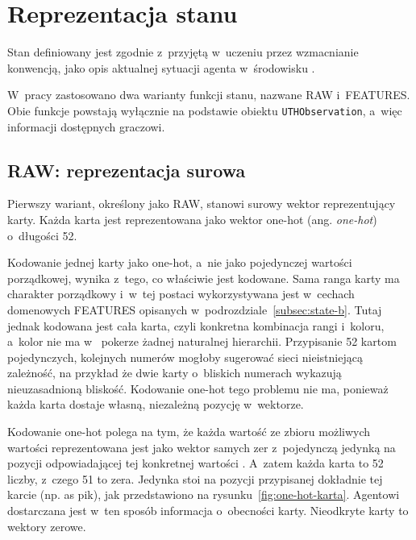 \section{Reprezentacja stanu}
\label{sec:reprezentacja-stanu}
Stan definiowany jest zgodnie z~przyjętą w~uczeniu przez wzmacnianie konwencją, jako
opis aktualnej sytuacji agenta w~środowisku \cite{state_representation}.

W~pracy zastosowano dwa warianty funkcji stanu, nazwane
RAW i~FEATURES. Obie funkcje powstają wyłącznie na podstawie obiektu
\texttt{UTHObservation}, a~więc informacji dostępnych graczowi.

\subsection{RAW: reprezentacja surowa}
\label{subsec:state-a}

Pierwszy wariant, określony jako RAW, stanowi surowy wektor
reprezentujący karty. Każda karta jest reprezentowana jako wektor one-hot (ang. \emph{one-hot}) \cite{one_hot_encoding}
o~długości 52.

Kodowanie jednej karty jako one-hot, a~nie jako pojedynczej wartości
porządkowej, wynika z~tego, co właściwie jest kodowane. Sama ranga karty ma
charakter porządkowy i~w~tej postaci wykorzystywana jest w~cechach domenowych
FEATURES opisanych w~podrozdziale~\ref{subsec:state-b}. Tutaj jednak kodowana jest
cała karta, czyli konkretna kombinacja rangi i~koloru, a~kolor nie ma w~
pokerze żadnej naturalnej hierarchii. Przypisanie 52 kartom pojedynczych,
kolejnych numerów mogłoby sugerować sieci nieistniejącą zależność, na przykład
że dwie karty o~bliskich numerach wykazują nieuzasadnioną bliskość. Kodowanie
one-hot tego problemu nie ma, ponieważ każda karta dostaje własną,
niezależną pozycję w~wektorze.

Kodowanie one-hot polega na tym, że każda wartość ze zbioru możliwych
wartości reprezentowana jest jako wektor samych zer z~pojedynczą jedynką na
pozycji odpowiadającej tej konkretnej wartości \cite{one_hot_encoding}.
A~zatem każda karta to 52 liczby, z~czego 51 to zera. Jedynka stoi na
pozycji przypisanej dokładnie tej karcie (np. as pik), jak przedstawiono
na rysunku~\ref{fig:one-hot-karta}. Agentowi dostarczana jest w~ten sposób informacja
o~obecności karty. Nieodkryte karty to wektory zerowe.

